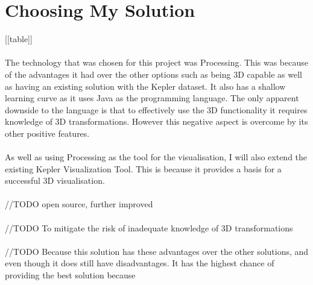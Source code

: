 \documentclass[11pt
              , a4paper
              , twoside
              , openright
              ]{report}
\begin{document}
\section{Choosing My Solution}
[[table]]
\\\\
The technology that was chosen for this project was Processing. This was because of the advantages it had over the other options such as being 3D capable as well as having an existing solution with the Kepler dataset. It also has a shallow learning curve as it uses Java as the programming language. The only apparent downside to the language is that to effectively use the 3D functionality it requires knowledge of 3D transformations. However this negative aspect is overcome by its other positive features.
\\\\
As well as using Processing as the tool for the visualisation, I will also extend the existing Kepler Visualization Tool. This is because it provides a basis for a successful 3D visualisation.
\\\\
//TODO open source, further improved
\\\\
//TODO To mitigate the risk of inadequate knowledge of 3D transformations
\\\\
//TODO Because this solution has these advantages over the other solutions, and even though it does still have disadvantages. It has the highest chance of providing the best solution because 
\end{document}
